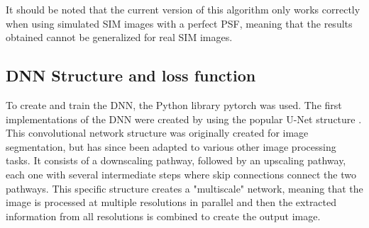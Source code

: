 \documentclass[conference]{IEEEtran}
\begin{document}
It should be noted that the current version of this algorithm only works correctly when using simulated SIM images with a perfect PSF, meaning that the results obtained cannot be generalized for real SIM images.

\subsection{DNN Structure and loss function}
To create and train the DNN, the Python library pytorch \cite{PyTorch_website} was used. The first implementations of the DNN were created by using the popular U-Net structure \cite{ronneberger2015unet}. This convolutional network structure was originally created for image segmentation, but has since been adapted to various other image processing tasks. It consists of a downscaling pathway, followed by an upscaling pathway, each one with several intermediate steps where skip connections connect the two pathways. This specific structure creates a "multiscale" network, meaning that the image is processed at multiple resolutions in parallel and then the extracted information from all resolutions is combined to create the output image.
\end{document}
